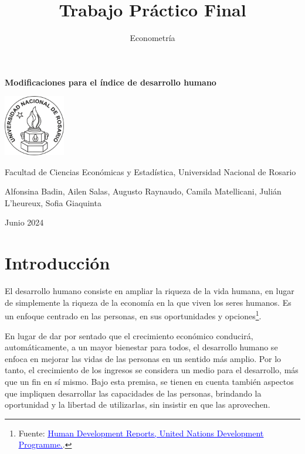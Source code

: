 \documentclass[
  10pt,
]{article}
\title{Trabajo Práctico Final}
\author{Econometría}
\date{}
\begin{document}
\maketitle

\begin{center}
    \vspace*{0.5cm}
    \Huge\textbf{Modificaciones para el índice de desarrollo humano}
    
    \vspace{4cm}
    \includegraphics[width=0.2\textwidth]{logo_fceye.png}
  
    \vspace{0cm}
    \large{Facultad de Ciencias Económicas y Estadística, Universidad Nacional de Rosario}
    
    \vspace{0.5cm}
    \large{Alfonsina Badin, Ailen Salas, Augusto Raynaudo, Camila Matellicani, Julián L'heureux, Sofia Giaquinta}
    
    \vspace{0.5cm}
    \large{Junio 2024}
    
\end{center}

\clearpage

\hypertarget{introducciuxf3n}{%
\section{Introducción}\label{introducciuxf3n}}

El desarrollo humano consiste en ampliar la riqueza de la vida humana,
en lugar de simplemente la riqueza de la economía en la que viven los
seres humanos. Es un enfoque centrado en las personas, en sus
oportunidades y opciones\footnote{Fuente:
  \href{https://hdr.undp.org/about/human-development}{\textcolor{blue}{\underline{Human Development Reports, United Nations Development Programme.}}}.}.

En lugar de dar por sentado que el crecimiento económico conducirá,
automáticamente, a un mayor bienestar para todos, el desarrollo humano
se enfoca en mejorar las vidas de las personas en un sentido más amplio.
Por lo tanto, el crecimiento de los ingresos se considera un medio para
el desarrollo, más que un fin en sí mismo. Bajo esta premisa, se tienen
en cuenta también aspectos que impliquen desarrollar las capacidades de
las personas, brindando la oportunidad y la libertad de utilizarlas, sin
insistir en que las aprovechen.
\end{document}
